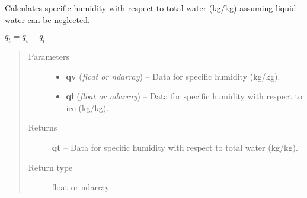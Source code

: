 \documentclass[letterpaper,10pt,english]{sphinxmanual}
\begin{document}

\begin{fulllineitems}
\label{atmos:atmos.equations.qt_from_qv_qi}
Calculates specific humidity with respect to total water (kg/kg) assuming liquid
water can be neglected.

\(q_t = q_v+q_l\)
\begin{quote}\begin{description}
\item[{Parameters}] \leavevmode\begin{itemize}
\item {} 
\textbf{qv} (\emph{float or ndarray}) -- Data for specific humidity (kg/kg).

\item {} 
\textbf{qi} (\emph{float or ndarray}) -- Data for specific humidity with respect to ice (kg/kg).

\end{itemize}

\item[{Returns}] \leavevmode
\textbf{qt} --
Data for specific humidity with respect to total water (kg/kg).

\item[{Return type}] \leavevmode
float or ndarray

\end{description}\end{quote}

\end{fulllineitems}

\end{document}
